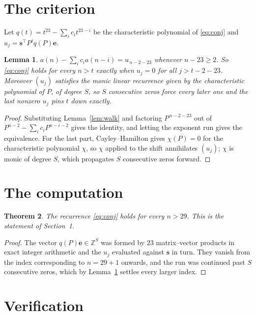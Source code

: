 \documentclass[11pt,a4paper]{article}
\theoremstyle{plain}
\newtheorem{theorem}{Theorem}
\newtheorem{lemma}[theorem]{Lemma}
\theoremstyle{definition}
\begin{document}
\section{The criterion}

Let $q(t)=t^{23}-\sum_i c_i t^{23-i}$ be the characteristic polynomial of
\eqref{eq:conj} and $u_j=\mathbf{s}^{\!\top}P^{j}q(P)\mathbf{e}$.

\begin{lemma}\label{lem:crit}
$a(n)-\sum_i c_i a(n-i)=u_{\,n-2-23}$ whenever $n-23\ge2$. So \eqref{eq:conj}
holds for every $n>t$ exactly when $u_j=0$ for all $j>t-2-23$. Moreover $(u_j)$
satisfies the monic linear recurrence given by the characteristic polynomial of $P$, of
degree $S$, so $S$ consecutive zeros force every later one and the last nonzero $u_j$ pins
$t$ down exactly.
\end{lemma}

\begin{proof}
Substituting Lemma~\ref{lem:walk} and factoring $P^{\,n-2-23}$ out of
$P^{n-2}-\sum_i c_i P^{n-i-2}$ gives the identity, and letting the exponent run gives the
equivalence. For the last part, Cayley--Hamilton gives $\chi(P)=0$ for the characteristic
polynomial $\chi$, so $\chi$ applied to the shift annihilates $(u_j)$; $\chi$ is monic of
degree $S$, which propagates $S$ consecutive zeros forward.
\end{proof}

\section{The computation}

\begin{theorem}
The recurrence \eqref{eq:conj} holds for every $n>29$. This is the statement of
Section~1.
\end{theorem}

\begin{proof}
The vector $q(P)\mathbf{e}\in\mathbb{Z}^{S}$ was formed by $23$ matrix--vector
products in exact integer arithmetic and the $u_j$ evaluated against $\mathbf{s}$ in turn.
They vanish from the index corresponding to $n=29+1$ onwards, and the run was continued
past $S$ consecutive zeros, which by Lemma~\ref{lem:crit} settles every larger index.
\end{proof}

\section{Verification}
\end{document}
